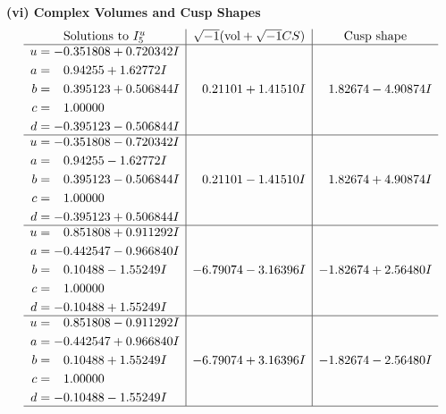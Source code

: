 \documentclass[1p]{elsarticle_modified}
\theoremstyle{definition}
\newcommand{\I}{\sqrt{-1}}
\begin{document}
\newpage\flushleft \textbf{(vi) Complex Volumes and Cusp Shapes}
$$\begin{array}{c|c|c}  
\text{Solutions to }I^u_{5}& \I (\text{vol} + \sqrt{-1}CS) & \text{Cusp shape}\\
 \hline 
\begin{aligned}
u &= -0.351808 + 0.720342 I \\
a &= \phantom{-}0.94255 + 1.62772 I \\
b &= \phantom{-}0.395123 + 0.506844 I \\
c &= \phantom{-}1.00000\phantom{ +0.000000I} \\
d &= -0.395123 - 0.506844 I\end{aligned}
 & \phantom{-}0.21101 + 1.41510 I & \phantom{-}1.82674 - 4.90874 I \\ \hline\begin{aligned}
u &= -0.351808 - 0.720342 I \\
a &= \phantom{-}0.94255 - 1.62772 I \\
b &= \phantom{-}0.395123 - 0.506844 I \\
c &= \phantom{-}1.00000\phantom{ +0.000000I} \\
d &= -0.395123 + 0.506844 I\end{aligned}
 & \phantom{-}0.21101 - 1.41510 I & \phantom{-}1.82674 + 4.90874 I \\ \hline\begin{aligned}
u &= \phantom{-}0.851808 + 0.911292 I \\
a &= -0.442547 - 0.966840 I \\
b &= \phantom{-}0.10488 - 1.55249 I \\
c &= \phantom{-}1.00000\phantom{ +0.000000I} \\
d &= -0.10488 + 1.55249 I\end{aligned}
 & -6.79074 - 3.16396 I & -1.82674 + 2.56480 I \\ \hline\begin{aligned}
u &= \phantom{-}0.851808 - 0.911292 I \\
a &= -0.442547 + 0.966840 I \\
b &= \phantom{-}0.10488 + 1.55249 I \\
c &= \phantom{-}1.00000\phantom{ +0.000000I} \\
d &= -0.10488 - 1.55249 I\end{aligned}
 & -6.79074 + 3.16396 I & -1.82674 - 2.56480 I\\
 \hline 
 \end{array}$$\newpage\newpage\renewcommand{\arraystretch}{1}
\end{document}
